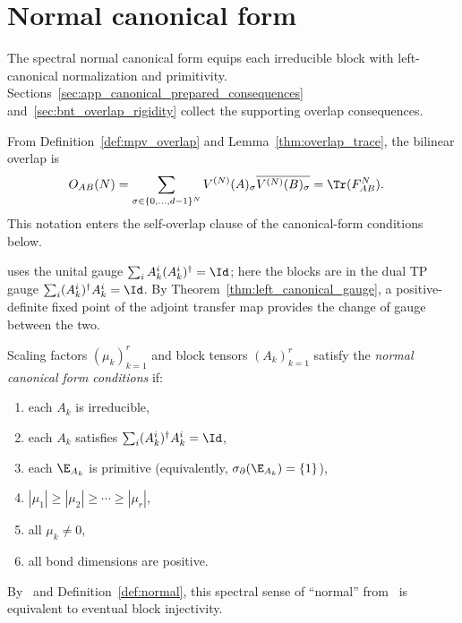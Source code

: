 \section{Normal canonical form}\label{sec:normal_canonical_form}

The spectral normal canonical form equips each irreducible block with
left-canonical normalization and primitivity. Sections~\ref{sec:app_canonical_prepared_consequences}
and~\ref{sec:bnt_overlap_rigidity} collect the supporting overlap consequences.

From Definition~\ref{def:mpv_overlap} and
Lemma~\ref{thm:overlap_trace}, the bilinear overlap is
\begin{align}
    O_{AB}(N)
     & =
    \sum_{\sigma\in\{0,\ldots,d{-}1\}^N}
    V^{(N)}(A)_\sigma\overline{V^{(N)}(B)_\sigma}
    =\Tr(F_{AB}^N).
    \label{eq:canonical_overlap_trace}
\end{align}
This notation enters the self-overlap clause of the canonical-form conditions
below.


\begin{remark}\label{rem:tp_vs_unital}
    \cite[Theorem~4]{PerezGarcia2007Matrix} uses the unital gauge
    $\sum_iA_k^i(A_k^i)^\dagger=\Id$; here the blocks are in the dual TP gauge
    $\sum_i(A_k^i)^\dagger A_k^i=\Id$. By Theorem~\ref{thm:left_canonical_gauge},
    a positive-definite fixed point of the adjoint transfer map provides the
    change of gauge between the two.
\end{remark}

\begin{definition}
    \label{def:is_normal_canonical_form}
    Scaling factors $(\mu_k)_{k=1}^r$ and block tensors $(A_k)_{k=1}^r$
    satisfy the \emph{normal canonical form conditions} if:
    \begin{enumerate}
        \item each $A_k$ is irreducible,
        \item each $A_k$ satisfies $\sum_i(A_k^i)^\dagger A_k^i=\Id$,
        \item each $\E_{A_k}$ is primitive
              (equivalently, $\sigma_\partial(\E_{A_k})=\{1\}$),
        \item $|\mu_1|\ge|\mu_2|\ge\cdots\ge|\mu_r|$,
        \item all $\mu_k\neq0$,
        \item all bond dimensions are positive.
    \end{enumerate}
    By~\cite[Proposition~3]{Sanz2010Quantum} and Definition~\ref{def:normal},
    this spectral sense of ``normal'' from~\cite{Cirac2016MPDO_arXiv} is
    equivalent to eventual block injectivity.
\end{definition}

